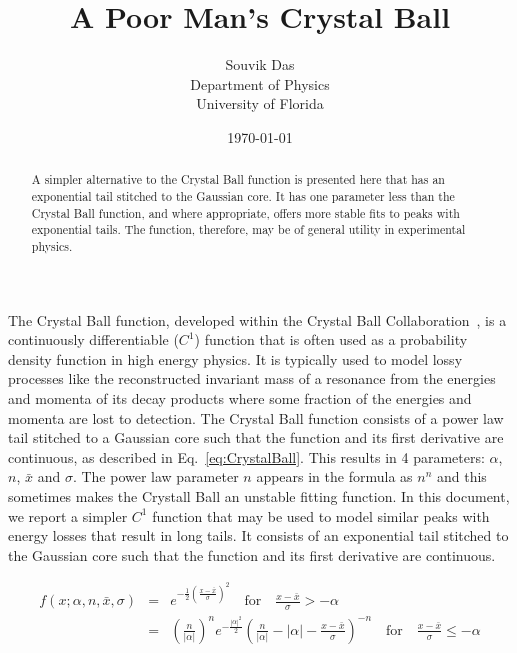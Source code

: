 \documentclass[10pt,letterpaper]{article}
\begin{document}
\title{A Poor Man's Crystal Ball}
\date{\today}
\author{Souvik Das\\ Department of Physics \\ University of Florida}
\maketitle

\begin{abstract}
A simpler alternative to the Crystal Ball function is presented here that has an exponential tail stitched to the Gaussian core. It has one parameter less than the Crystal Ball function, and where appropriate, offers more stable fits to peaks with exponential tails. The function, therefore, may be of general utility in experimental physics.
\end{abstract}

\bigskip

The Crystal Ball function, developed within the Crystal Ball Collaboration~\cite{Oreglia:1980cs, Skwarnicki:1986xj}, is a continuously differentiable ($C^1$) function that is often used as a probability density function in high energy physics. It is typically used to model lossy processes like the reconstructed invariant mass of a resonance from the energies and momenta of its decay products where some fraction of the energies and momenta are lost to detection. The Crystal Ball function consists of a power law tail stitched to a Gaussian core such that the function and its first derivative are continuous, as described in Eq.~\ref{eq:CrystalBall}. This results in 4 parameters: $\alpha$, $n$, $\bar{x}$ and $\sigma$. The power law parameter $n$ appears in the formula as $n^n$ and this sometimes makes the Crystall Ball an unstable fitting function. In this document, we report a simpler $C^1$ function that may be used to model similar peaks with energy losses that result in long tails. It consists of an exponential tail stitched to the Gaussian core such that the function and its first derivative are continuous.

\begin{eqnarray}
\label{eq:CrystalBall}
f(x; \alpha, n, \bar{x}, \sigma) &=& e^{-\frac{1}{2}\left({\frac{x-\bar{x}}{\sigma}}\right)^2} \quad \textrm{for} \quad \frac{x-\bar{x}}{\sigma} > -\alpha \\
                                 &=& \left(\frac{n}{|\alpha|}\right)^n e^{-\frac{|\alpha|^2}{2}} \left( \frac{n}{|\alpha|} - |\alpha| - \frac{x-\bar{x}}{\sigma} \right)^{-n} \quad \textrm{for} \quad \frac{x-\bar{x}}{\sigma} \leq -\alpha \nonumber
\end{eqnarray}
\end{document}

